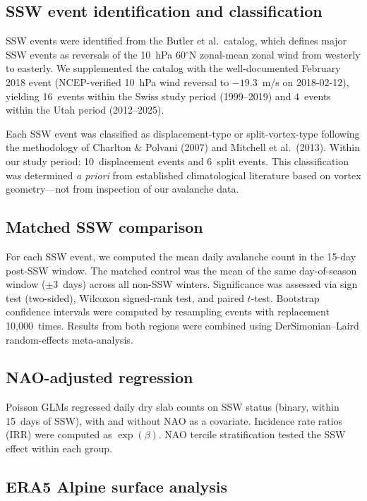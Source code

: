 \documentclass[11pt,a4paper]{article}
\begin{document}
\subsection{SSW event identification and classification}

SSW events were identified from the Butler et al.\ catalog, which defines major SSW events as reversals of the 10~hPa 60$^\circ$N zonal-mean zonal wind from westerly to easterly. We supplemented the catalog with the well-documented February 2018 event (NCEP-verified 10~hPa wind reversal to $-19.3$~m/s on 2018-02-12), yielding 16~events within the Swiss study period (1999--2019) and 4~events within the Utah period (2012--2025).

Each SSW event was classified as displacement-type or split-vortex-type following the methodology of Charlton \& Polvani (2007) and Mitchell et al.\ (2013). Within our study period: 10~displacement events and 6~split events. This classification was determined \textit{a priori} from established climatological literature based on vortex geometry---not from inspection of our avalanche data.

\subsection{Matched SSW comparison}

For each SSW event, we computed the mean daily avalanche count in the 15-day post-SSW window. The matched control was the mean of the same day-of-season window ($\pm 3$~days) across all non-SSW winters. Significance was assessed via sign test (two-sided), Wilcoxon signed-rank test, and paired $t$-test. Bootstrap confidence intervals were computed by resampling events with replacement 10,000~times. Results from both regions were combined using DerSimonian--Laird random-effects meta-analysis.

\subsection{NAO-adjusted regression}

Poisson GLMs regressed daily dry slab counts on SSW status (binary, within 15~days of SSW), with and without NAO as a covariate. Incidence rate ratios (IRR) were computed as $\exp(\beta)$. NAO tercile stratification tested the SSW effect within each group.

\subsection{ERA5 Alpine surface analysis}
\end{document}
